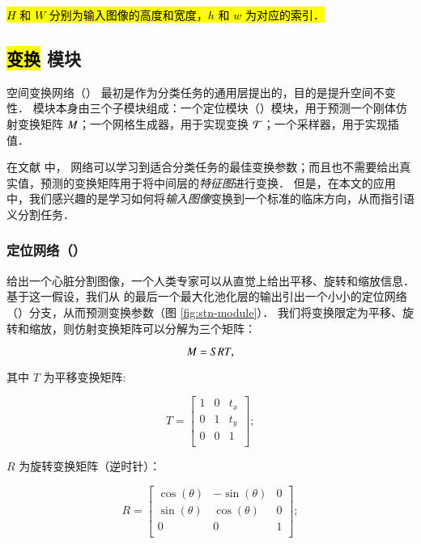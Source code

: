 \hl{
$H$ 和 $W$ 分别为输入图像的高度和宽度，$h$ 和 $w$ 为对应的索引．
}

\subsection{\hl{变换} 模块}\label{sec:stn}



空间变换网络（\STN{}） 最初是作为分类任务的通用层提出的，目的是提升空间不变性\citep{Jaderberg2015}．
\STN{} 模块本身由三个子模块组成：一个定位模块（\LocNet{}）模块，用于预测一个刚体仿射变换矩阵 $M$；一个网格生成器，用于实现变换 $\mathcal{T}$；一个采样器，用于实现插值．

在文献 \citep{Jaderberg2015} 中，\STN{} 网络可以学习到适合分类任务的最佳变换参数；而且也不需要给出真实值，预测的变换矩阵用于将中间层的\emph{特征图}进行变换．
但是，在本文的应用中，我们感兴趣的是学习如何将\emph{输入图像}变换到一个标准的临床方向，从而指引语义分割任务．

\subsubsection{定位网络（\LocNet{}）}

给出一个心脏分割图像，一个人类专家可以从直觉上给出平移、旋转和缩放信息．
基于这一假设，我们从 \UNet{} 的最后一个最大化池化层的输出引出一个小小的定位网络（\LocNet{}）分支，从而预测变换参数（图 \ref{fig:stn-module}）．
我们将变换限定为平移、旋转和缩放，则仿射变换矩阵可以分解为三个矩阵：

$$
M = SRT,
$$

\noindent 其中 $T$ 为平移变换矩阵:

$$
T =
\begin{bmatrix}
1 & 0 & t_x \\
0 & 1 & t_y \\
0 & 0 & 1 \\
\end{bmatrix};
$$

\noindent $R$ 为旋转变换矩阵（逆时针）：

$$
R =
\begin{bmatrix}
\cos(\theta) & - \sin(\theta) & 0 \\
\sin(\theta) & \cos(\theta) & 0 \\
0 & 0 & 1 \\
\end{bmatrix};
$$

